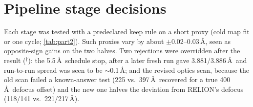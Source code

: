 \section{Pipeline stage decisions}
\label{sec:suppl:part2}
\begin{table}[!htb]
\centering
{}
\caption{\textbf{Stage decisions} (cross-FSC 0.143 crossings, \AA, lower is better). $^\dagger$Rejected by the rule, kept after the result.}
\label{tab:part2}
\end{table}

Each stage was tested with a predeclared keep rule on a short proxy (cold map fit or one cycle; \cref{tab:part2}).
Such proxies vary by about $\pm$0.02--0.03\,\AA, seen as opposite-sign gains on the two halves.
Two rejections were overridden after the result ($^\dagger$): the 5.5\,\AA\ schedule stop, after a later fresh run gave 3.881/3.886\,\AA\ and run-to-run spread was seen to be $\sim$0.1\,\AA; and the revised optics scan, because the old scan failed a known-answer test (225 vs.\ 397\,\AA\ recovered for a true 400\,\AA\ defocus offset) and the new one halves the deviation from RELION's defocus (118/141 vs.\ 221/217\,\AA).

